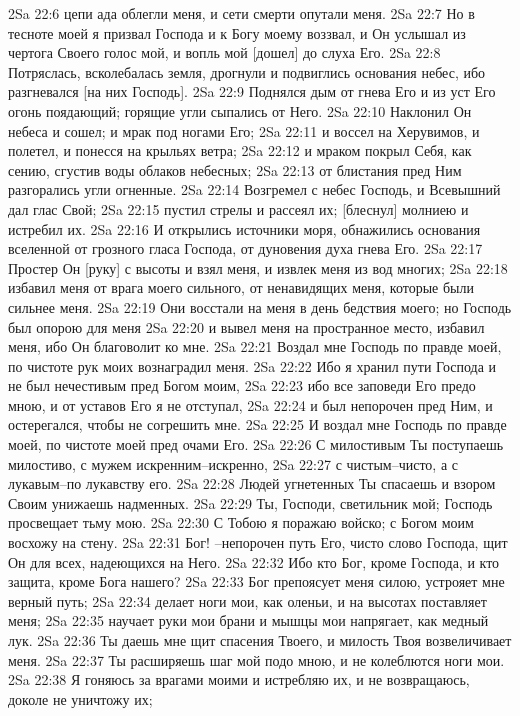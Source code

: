 2Sa 22:6  цепи ада облегли меня, и сети смерти опутали меня.
2Sa 22:7  Но в тесноте моей я призвал Господа и к Богу моему воззвал, и Он услышал из чертога Своего голос мой, и вопль мой [дошел] до слуха Его.
2Sa 22:8  Потряслась, всколебалась земля, дрогнули и подвиглись основания небес, ибо разгневался [на них Господь].
2Sa 22:9  Поднялся дым от гнева Его и из уст Его огонь поядающий; горящие угли сыпались от Него.
2Sa 22:10  Наклонил Он небеса и сошел; и мрак под ногами Его;
2Sa 22:11  и воссел на Херувимов, и полетел, и понесся на крыльях ветра;
2Sa 22:12  и мраком покрыл Себя, как сению, сгустив воды облаков небесных;
2Sa 22:13  от блистания пред Ним разгорались угли огненные.
2Sa 22:14  Возгремел с небес Господь, и Всевышний дал глас Свой;
2Sa 22:15  пустил стрелы и рассеял их; [блеснул] молниею и истребил их.
2Sa 22:16  И открылись источники моря, обнажились основания вселенной от грозного гласа Господа, от дуновения духа гнева Его.
2Sa 22:17  Простер Он [руку] с высоты и взял меня, и извлек меня из вод многих;
2Sa 22:18  избавил меня от врага моего сильного, от ненавидящих меня, которые были сильнее меня.
2Sa 22:19  Они восстали на меня в день бедствия моего; но Господь был опорою для меня
2Sa 22:20  и вывел меня на пространное место, избавил меня, ибо Он благоволит ко мне.
2Sa 22:21  Воздал мне Господь по правде моей, по чистоте рук моих вознаградил меня.
2Sa 22:22  Ибо я хранил пути Господа и не был нечестивым пред Богом моим,
2Sa 22:23  ибо все заповеди Его предо мною, и от уставов Его я не отступал,
2Sa 22:24  и был непорочен пред Ним, и остерегался, чтобы не согрешить мне.
2Sa 22:25  И воздал мне Господь по правде моей, по чистоте моей пред очами Его.
2Sa 22:26  С милостивым Ты поступаешь милостиво, с мужем искренним--искренно,
2Sa 22:27  с чистым--чисто, а с лукавым--по лукавству его.
2Sa 22:28  Людей угнетенных Ты спасаешь и взором Своим унижаешь надменных.
2Sa 22:29  Ты, Господи, светильник мой; Господь просвещает тьму мою.
2Sa 22:30  С Тобою я поражаю войско; с Богом моим восхожу на стену.
2Sa 22:31  Бог! --непорочен путь Его, чисто слово Господа, щит Он для всех, надеющихся на Него.
2Sa 22:32  Ибо кто Бог, кроме Господа, и кто защита, кроме Бога нашего?
2Sa 22:33  Бог препоясует меня силою, устрояет мне верный путь;
2Sa 22:34  делает ноги мои, как оленьи, и на высотах поставляет меня;
2Sa 22:35  научает руки мои брани и мышцы мои напрягает, как медный лук.
2Sa 22:36  Ты даешь мне щит спасения Твоего, и милость Твоя возвеличивает меня.
2Sa 22:37  Ты расширяешь шаг мой подо мною, и не колеблются ноги мои.
2Sa 22:38  Я гоняюсь за врагами моими и истребляю их, и не возвращаюсь, доколе не уничтожу их;
